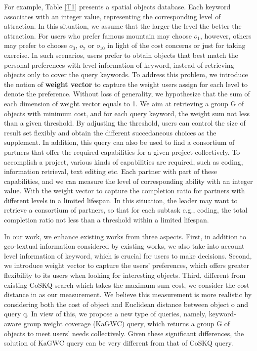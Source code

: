 For example, Table \ref{T1} presents a spatial objects database. Each keyword associates with an integer value, representing the corresponding level of attraction. In this situation, we assume that the larger the level the better the attraction. For users who prefer famous mountain may choose $o_1$, however, others may prefer to choose $o_3$, $o_7$ or $o_{10}$ in light of the cost concerns or just for taking exercise. In such scenarios, users prefer to obtain objects that best match the personal preferences with level information of keyword, instead of retrieving objects only to cover the query keywords. To address this problem, we introduce the notion of \textbf{weight vector} to capture the weight users assign for each level to denote the preference. Without loss of generality, we hypothesize that the sum of each dimension of weight vector equals to 1. We aim at retrieving a group G of objects with minimum cost, and for each query keyword, the weight sum not less than a given threshold. By adjusting the threshold, users can control the size of result set flexibly and obtain the different succedaneous choices as the supplement. In addition, this query can also be used to find a consortium of partners that offer the required capabilities for a given project collectively. To accomplish a project, various kinds of capabilities are required, such as coding, information retrieval, text editing etc. Each partner with part of these capabilities, and we can measure the level of corresponding ability with an integer value. With the weight vector to capture the completion ratio for partners with different levels in a limited lifespan. In this situation, the leader may want to retrieve a consortium of partners, so that for each subtask e.g., coding, the total completion ratio not less than a threshold within a limited lifespan.

In our work, we enhance existing works from three aspects. First, in addition to geo-textual information considered by existing works, we also take into account level information of keyword, which is crucial for users to make decisions. Second, we introduce weight vector to capture the users' preferences, which offers greater flexibility to its users when looking for interesting objects. Third, different from existing CoSKQ search which takes the maximum sum cost, we consider the cost distance in \cite{chen2014efficient} as our measurement. We believe this measurement is more realistic by considering both the cost of object and Euclidean distance between object o and query q. In view of this, we propose a new type of queries, namely, keyword-aware group weight coverage (KaGWC) query, which returns a group G of objects to meet users' needs collectively. Given these significant differences, the solution of KaGWC query can be very different from that of CoSKQ query.

